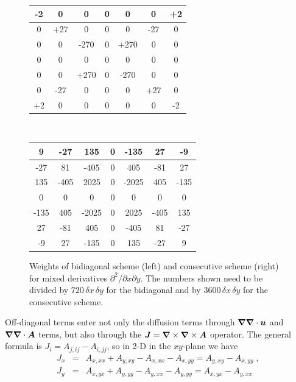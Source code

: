 \documentclass[\mydriver,12pt,twoside,notitlepage,a4paper]{article}
\renewcommand{\vec}[1]{\mbox{\boldmath{$#1$}}}
\newcommand{\Av}            {\vec{A}}
\newcommand{\Jv}            {\vec{J}}
\newcommand{\uv}            {\vec{u}}
\newcommand{\nab}{\mbox{\boldmath $\nabla$} {}}
\begin{document}
\begin{figure}[h]
  \centering
  \footnotesize

  \begin{tabular}{|c|c|c|c|c|c|c|}
    \hline
    -2 & 0   & 0    & 0 & 0    & 0   & +2 \\
    \hline
    0  & +27 & 0    & 0 & 0    & -27 & 0  \\
    \hline
    0  & 0   & -270 & 0 & +270 & 0   & 0  \\
    \hline
    0  & 0   & 0    & 0 & 0    & 0   & 0  \\
    \hline
    0  & 0   & +270 & 0 & -270 & 0   & 0  \\
    \hline
    0  & -27 & 0    & 0 & 0    & +27 & 0  \\
    \hline
    +2 & 0   & 0    & 0 & 0    & 0   & -2 \\
    \hline
  \end{tabular}\
  \qquad\qquad\
  \begin{tabular}{|c|c|c|c|c|c|c|}
    \hline
    9    & -27  & 135   & 0 & -135  & 27   & -9   \\
    \hline
    -27  & 81   & -405  & 0 & 405   & -81  & 27   \\
    \hline
    135  & -405 & 2025  & 0 & -2025 & 405  & -135 \\
    \hline
    0    & 0    & 0     & 0 & 0     & 0    & 0    \\
    \hline
    -135 & 405  & -2025 & 0 & 2025  & -405 & 135  \\
    \hline
    27   & -81  & 405   & 0 & -405  & 81   & -27  \\
    \hline
    -9   & 27   & -135  & 0 & 135   & -27  & 9    \\
    \hline
  \end{tabular}

  \caption{Weights of bidiagonal scheme (left) and consecutive scheme
    (right) for mixed derivatives $\partial^2/\partial x \partial y$.
    The numbers shown need to be divided by $720\,\delta x\,\delta y$ for
    the bidiagonal and by $3600\,\delta x\,\delta y$ for the consecutive
    scheme.
  }
  \label{Fig-bidiagonal-scheme}
\end{figure}

Off-diagonal terms enter not only the diffusion terms through
$\nab\nab\cdot\uv$ and $\nab\nab\cdot\Av$ terms, but also through
the $\Jv=\nab\times\nab\times\Av$ operator.
The general formula is $J_i=A_{j,ij}-A_{i,jj}$, so in 2-D in the
$xy$-plane we have
\begin{eqnarray}
  J_x &=& A_{x,xx}+A_{y,xy}-A_{x,xx}-A_{x,yy}=A_{y,xy}-A_{x,yy} \; , \\
  J_y &=& A_{x,yx}+A_{y,yy}-A_{y,xx}-A_{y,yy}=A_{x,yx}-A_{y,xx}
\end{eqnarray}
\end{document}
